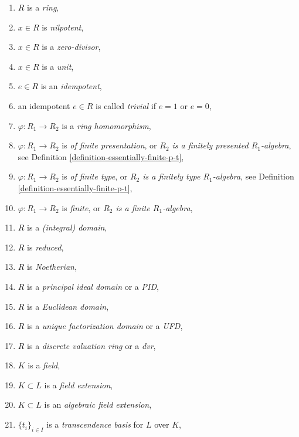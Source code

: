 \begin{enumerate}
\item $R$ is a {\it ring},
\label{ring}
\item $x\in R$ is {\it nilpotent},
\label{ring-element-nilpotent}
\item $x\in R$ is a {\it zero-divisor},
\label{ring-element-zerodivisor}
\item $x\in R$ is a {\it unit},
\label{ring-element-unit}
\item $e \in R$ is an {\it idempotent},
\label{ring-element-idempotent}
\item an idempotent $e \in R$ is called {\it trivial}
if $e = 1$ or $e = 0$,
\label{idempotent-trivial}
\item $\varphi : R_1 \to R_2$ is a {\it ring homomorphism},
\label{ring-homomorphism}
\item $\varphi : R_1 \to R_2$ is {\it of finite presentation}, or
{\it $R_2$ is a finitely presented $R_1$-algebra},
see Definition \ref{definition-essentially-finite-p-t},
\label{ring-homomorphism-finite-presentation}
\item $\varphi : R_1 \to R_2$ is {\it of finite type}, or
{\it $R_2$ is a finitely type $R_1$-algebra},
see Definition \ref{definition-essentially-finite-p-t},
\label{ring-homomorphism-finite-type}
\item $\varphi : R_1 \to R_2$ is {\it finite}, or
{\it $R_2$ is a finite $R_1$-algebra},
\label{ring-homomorphism-finite}
\item $R$ is a {\it (integral) domain},
\label{ring-domain}
\item $R$ is {\it reduced},
\label{ring-reduced}
\item $R$ is {\it Noetherian},
\label{ring-Noetherian}
\item $R$ is a {\it principal ideal domain} or a {\it PID},
\label{ring-PID}
\item $R$ is a {\it Euclidean domain},
\label{ring-Euclidean}
\item $R$ is a {\it unique factorization domain} or a {\it UFD},
\label{ring-UFD}
\item $R$ is a {\it discrete valuation ring} or a {\it dvr},
\label{ring-dvr}
\item $K$ is a {\it field},
\label{field}
\item $K \subset L$ is a {\it field extension},
\label{field-extension}
\item $K \subset L$ is an {\it algebraic field extension},
\label{field-extension-algebraic}
\item $\{t_i\}_{i\in I}$ is a {\it transcendence basis} for $L$ over $K$,

\end{enumerate}
